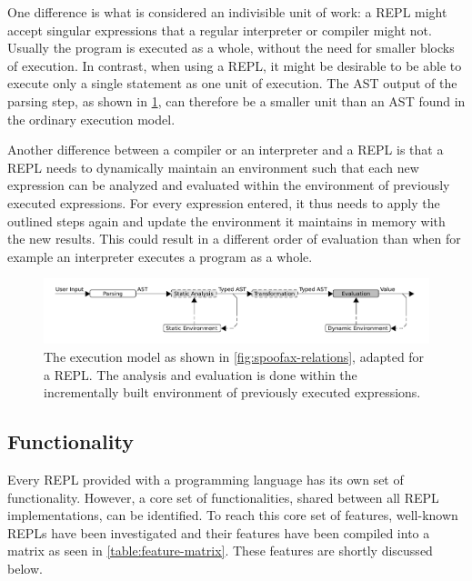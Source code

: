 One difference is what is considered an indivisible unit of work: a REPL might
accept singular expressions that a regular interpreter or compiler might
not. Usually the program is executed as a whole, without the need for smaller
blocks of execution. In contrast, when using a REPL, it might be desirable to be
able to execute only a single statement as one unit of execution. The AST output
of the parsing step, as shown in \cref{fig:execution-model-repl}, can therefore
be a smaller unit than an AST found in the ordinary execution model.

Another difference between a compiler or an interpreter and a REPL is that a
REPL needs to dynamically maintain an environment such that each new expression
can be analyzed and evaluated within the environment of previously executed
expressions. For every expression entered, it thus needs to apply the outlined
steps again and update the environment it maintains in memory with the new
results. This could result in a different order of evaluation than when for
example an interpreter executes a program as a whole.

\begin{figure}[t]
  \centering
  \includegraphics[width=\textwidth]{execution-model-repl}
  \caption{The execution model as shown in \cref{fig:spoofax-relations}, adapted
    for a REPL. The analysis and evaluation is done within the incrementally
    built environment of previously executed expressions.}
  \label{fig:execution-model-repl}
\end{figure}

\subsection{Functionality}
\label{ssec:repl-functionality}

Every REPL provided with a programming language has its own set of
functionality. However, a core set of functionalities, shared between all REPL
implementations, can be identified. To reach this core set of features,
well-known REPLs have been investigated and their features have been compiled
into a matrix as seen in \cref{table:feature-matrix}. These features are shortly
discussed below.


